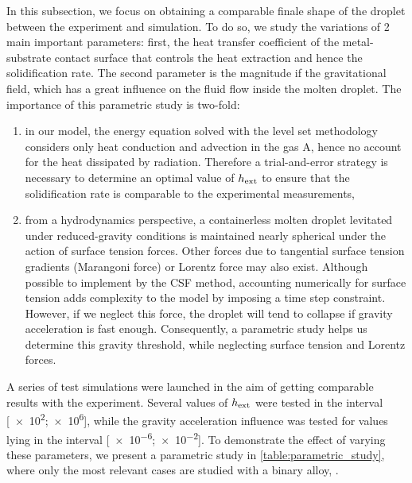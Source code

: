 In this subsection, we focus on obtaining a comparable finale shape of the droplet between the experiment and simulation.
To do so, we study the variations of 2 main important parameters: first, the heat transfer coefficient of the metal-substrate 
contact surface that controls the heat extraction and hence the solidification rate. 
The second parameter is the magnitude if the gravitational field,
which has a great influence on the fluid flow inside the molten droplet.
The importance of this parametric study is two-fold: 
\begin{enumerate}
\itemsep0em

\item in our model, the energy equation solved with the level set methodology considers only heat conduction 
and advection in the gas A, hence no account for the heat dissipated by radiation.
Therefore a trial-and-error strategy is necessary to determine an optimal value of $h_{\text{ext}}$ 
to ensure that the solidification rate is comparable to the experimental measurements,

\item from a hydrodynamics perspective, a containerless molten droplet levitated under reduced-gravity conditions is maintained nearly spherical 
under the action of surface tension forces. Other forces due to tangential surface tension gradients (Marangoni force) or Lorentz force may also exist.
Although possible to implement by the CSF method, accounting numerically for surface tension adds complexity to the model by imposing
a time step constraint. However, if we neglect this force, the droplet will tend to collapse if gravity acceleration is fast enough.
Consequently, a parametric study helps us determine this gravity threshold, while neglecting surface tension and Lorentz forces. 
\end{enumerate}

A series of test simulations were launched in the aim of getting comparable results with the experiment.
Several values of $h_{\text{ext}}$ were tested in the interval [\num{e2};\num{e6}]\si{\uhconvec}, while the gravity acceleration influence was tested
for values lying in the interval [\num{e-6};\num{e-2}]\si{\uacceleration}. 
To demonstrate the effect of varying these parameters, we present a parametric study in \cref{table:parametric_study}, where only the most relevant cases are studied with
a binary alloy, .

